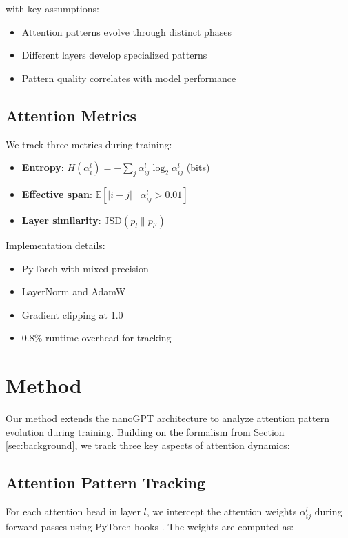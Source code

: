 \documentclass{article} %
\begin{document}
with key assumptions:
\begin{itemize}
    \item Attention patterns evolve through distinct phases
    \item Different layers develop specialized patterns
    \item Pattern quality correlates with model performance
\end{itemize}

\subsection{Attention Metrics}
We track three metrics during training:
\begin{itemize}
    \item \textbf{Entropy}: $H(\alpha_i^l) = -\sum_j \alpha_{ij}^l \log_2 \alpha_{ij}^l$ (bits)
    \item \textbf{Effective span}: $\mathbb{E}[|i-j| \mid \alpha_{ij}^l > 0.01]$
    \item \textbf{Layer similarity}: $\text{JSD}(p_l \| p_{l'})$
\end{itemize}

Implementation details:
\begin{itemize}
    \item PyTorch \citep{paszke2019pytorch} with mixed-precision
    \item LayerNorm \citep{ba2016layer} and AdamW \citep{loshchilov2017adamw}
    \item Gradient clipping at 1.0
    \item 0.8\% runtime overhead for tracking
\end{itemize}

\section{Method}
\label{sec:method}

Our method extends the nanoGPT architecture \citep{karpathy2023nanogpt} to analyze attention pattern evolution during training. Building on the formalism from Section \ref{sec:background}, we track three key aspects of attention dynamics:

\subsection{Attention Pattern Tracking}
For each attention head in layer $l$, we intercept the attention weights $\alpha_{ij}^l$ during forward passes using PyTorch hooks \citep{paszke2019pytorch}. The weights are computed as:
\end{document}
